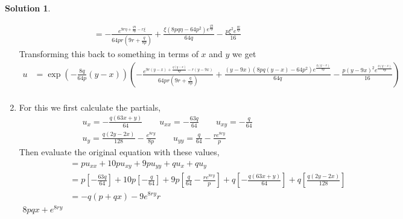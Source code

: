 \documentclass[10pt]{article}
\theoremstyle{definition}
\newtheorem{soln}{Solution}
\begin{document}
\begin{soln}
\begin{enumerate}[label=(\alph*)]
\begin{align*}
                                                 & =-\frac{e^{9r{\eta} + \frac{q{\eta}}{8p} - r{\xi}}}{64pr \left(9r + \frac{q}{8p}\right)} + \frac{{\xi} \left(8pq{\eta} - 64p^{2}\right) e^{\frac{q{\eta}}{8p}}}{64q} - \frac{p{\xi}^{2} e^{\frac{q{\eta}}{8p}}}{16}
          \end{align*}
          Transforming this back to something in terms of $x$ and $y$ we get
          \begin{align*}
            u & =\exp\left(-\frac{8q}{64p}(y-x)\right)\left(-\frac{e^{9r{(y-x)} + \frac{q{(y-x)}}{8p} - r{(y-9x)}}}{64pr \left(9r + \frac{q}{8p}\right)} + \frac{(y-9x) \left(8pq{(y-x)} - 64p^{2}\right) e^{\frac{q{(y-x)}}{8p}}}{64q} - \frac{p(y-9x)^{2} e^{\frac{q{(y-x)}}{8p}}}{16}\right) \\
          \end{align*}
    \item For this we first calculate the partials,
          \begin{align*}
             & u_x=-\frac{q \left(63x + y\right)}{64} \qquad u_{xx}=-\frac{63q}{64} \qquad u_{xy}=-\frac{q}{64}            \\
             & u_y=\frac{q \left(2y - 2x\right)}{128} - \frac{e^{8ry}}{8p} \qquad u_{yy}=\frac{q}{64} - \frac{re^{8ry}}{p}
          \end{align*}
          Then evaluate the original equation with these values,
          \begin{align*}
             & =pu_{xx}+10pu_{xy}+9pu_{yy}+qu_x+qu_y         \\
             & =p\left[-\frac{63q}{64}\right]+
            10p\left[-\frac{q}{64}\right]+
            9p\left[\frac{q}{64} - \frac{re^{8ry}}{p}\right]+
            q\left[-\frac{q \left(63x + y\right)}{64}\right]+
            q\left[\frac{q \left(2y - 2x\right)}{128}\right] \\
             & =-q\left(p+qx\right)-9e^{8ry}r                \\
            8pqx+e^{8ry}
          \end{align*}
  \end{enumerate}
\end{soln}
\end{document}
